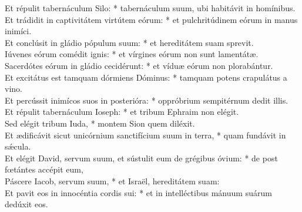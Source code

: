 {	Et répulit tabernáculum Silo: * tabernáculum suum, ubi habitávit in homínibus. \\
	Et trádidit in captivitátem virtútem eórum: * et pulchritúdinem eórum in manus inimíci. \\
	Et conclúsit in gládio pópulum suum: * et hereditátem suam sprevit. \\
	Iúvenes eórum comédit ignis: * et vírgines eórum non sunt lamentátæ. \\
	Sacerdótes eórum in gládio cecidérunt: * et víduæ eórum non plorabántur. \\
	Et excitátus est tamquam dórmiens Dóminus: * tamquam potens crapulátus a vino. \\
	Et percússit inimícos suos in posterióra: * oppróbrium sempitérnum dedit illis. \\
	Et répulit tabernáculum Ioseph: * et tribum Ephraim non elégit. \\
	Sed elégit tribum Iuda, * montem Sion quem diléxit. \\
	Et ædificávit sicut unicórnium sanctifícium suum in terra, * quam fundávit in sǽcula. \\
	Et elégit David, servum suum, et sústulit eum de grégibus óvium: * de post fœtántes accépit eum, \\
	Páscere Iacob, servum suum, * et Israël, hereditátem suam: \\
	Et pavit eos in innocéntia cordis sui: * et in intelléctibus mánuum suárum dedúxit eos. \\
}

